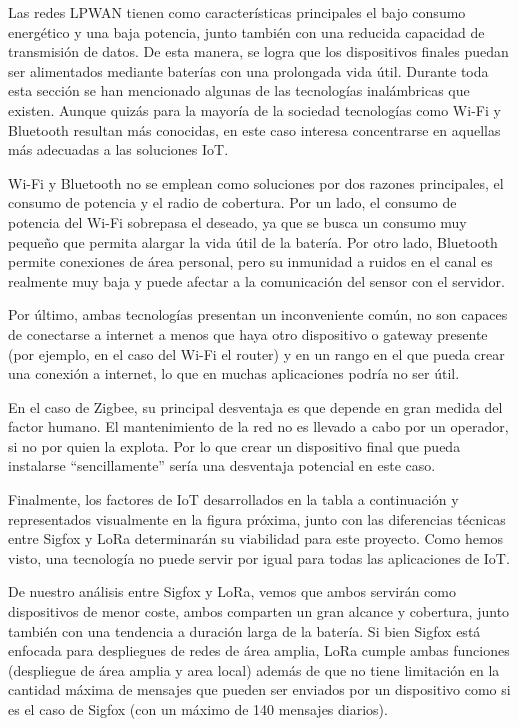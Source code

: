 Las redes LPWAN tienen como características principales el bajo consumo energético y una baja potencia, junto también con una reducida capacidad de transmisión de datos. De esta manera, se logra que los dispositivos finales puedan ser alimentados mediante baterías con una prolongada vida útil.
Durante toda esta sección se han mencionado algunas de las tecnologías inalámbricas que existen. Aunque quizás para la mayoría de la sociedad tecnologías como Wi-Fi y Bluetooth resultan más conocidas, en este caso interesa concentrarse en aquellas más adecuadas a las soluciones IoT.

Wi-Fi y Bluetooth no se emplean como soluciones por dos razones principales, el 
consumo de potencia y el radio de cobertura. Por un lado, el consumo de potencia del Wi-Fi sobrepasa el deseado, ya que se busca un consumo muy pequeño que permita alargar la vida útil de la batería. Por otro lado, Bluetooth permite conexiones de área personal, pero su inmunidad a ruidos en el canal es realmente muy baja y puede afectar a la comunicación del sensor con el servidor. 

Por último, ambas tecnologías presentan un inconveniente común, no son capaces de conectarse a internet a menos que haya otro dispositivo o gateway presente (por ejemplo, en el caso del Wi-Fi el router) y en un rango en el que pueda crear una conexión a internet, lo que en muchas aplicaciones podría no ser útil.

En el caso de Zigbee, su principal desventaja es que depende en gran medida del factor humano. El mantenimiento de la red no es llevado a cabo por un operador, si no por quien la explota. Por lo que crear un dispositivo final que pueda instalarse “sencillamente” sería una desventaja potencial en este caso.

Finalmente, los factores de IoT desarrollados en la tabla a continuación y representados visualmente en la figura próxima, junto con las diferencias técnicas entre Sigfox y LoRa determinarán su viabilidad para este proyecto. Como hemos visto, una tecnología no puede servir por igual para todas las aplicaciones de IoT. 

De nuestro análisis entre Sigfox y LoRa, vemos que ambos servirán como dispositivos de menor coste, ambos comparten un gran alcance y cobertura, junto también con una tendencia a duración larga de la batería. Si bien Sigfox está enfocada para despliegues de redes de área amplia, LoRa cumple ambas funciones (despliegue de área amplia y area local) además de que no tiene limitación en la cantidad máxima de mensajes que pueden ser enviados por un dispositivo como si es el caso de Sigfox (con un máximo de 140 mensajes diarios). 

